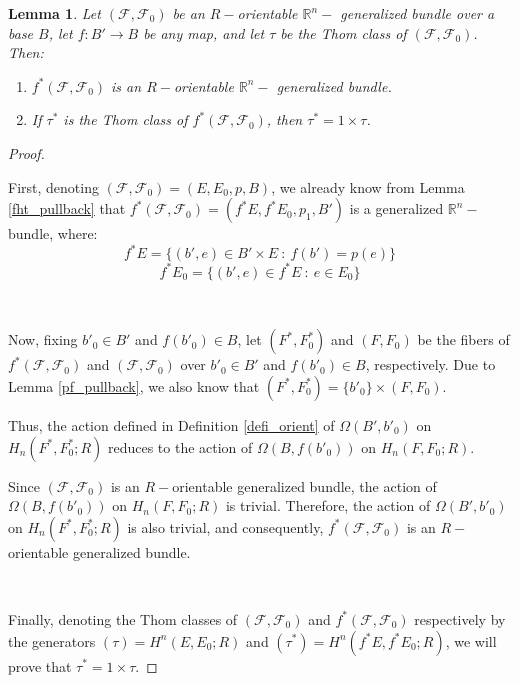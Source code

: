 \documentclass[12pt,oneside]{book}
\newtheorem{lem}    {Lemma}[chapter]
\newcommand{\R}{\mathbb{R}}
\begin{document}
    \begin{lem}\label{lema_thom_2}
    	Let $(\mathcal{F},\mathcal{F}_{0})$ be an $R-$orientable $\R^{n}-$ generalized bundle over a 
        base $B$, let $f:B'\to B$ be any map, and let $\tau$ be the Thom class of $(\mathcal{F},\mathcal{F}_{0})$. Then:
    	\begin{enumerate}
    		\item $f^{*}(\mathcal{F},\mathcal{F}_{0})$ is an $R-$orientable $\R^{n}-$ generalized bundle.
    		\item If $\tau^{*}$ is the Thom class of $f^{*}(\mathcal{F},\mathcal{F}_{0})$, then $\tau^{*}=1\times \tau$.
    	\end{enumerate}
    \end{lem}
    \begin{proof}

        \

        First, denoting $(\mathcal{F},\mathcal{F}_{0})=(E,E_{0},p,B)$, we already know from Lemma \ref{fht_pullback} that 
        $f^{*}(\mathcal{F},\mathcal{F}_{0})=(f^{*}E,f^{*}E_{0},p_{1},B')$ is a generalized $\R^{n}-$bundle, where:
        $$f^{*}E=\{ (b',e)\in B'\times E \ : \ f(b')=p(e) \}$$
        $$f^{*}E_{0}=\{ (b',e)\in f^{*}E \ : \ e\in E_{0} \}$$

        \

        Now, fixing $b'_{0}\in B'$ and $f(b'_{0})\in B$, let $(F^{*},F^{*}_{0})$ and $(F,F_{0})$ be the fibers of 
        $f^{*}(\mathcal{F},\mathcal{F}_{0})$ and $(\mathcal{F},\mathcal{F}_{0})$ over $b'_{0}\in B'$ and $f(b'_{0})\in B$, respectively. 
        Due to Lemma \ref{pf_pullback}, we also know that $(F^{*},F^{*}_{0})=\{ b'_{0} \}\times (F,F_{0})$.

        Thus, the action defined in Definition \ref{defi_orient} of $\Omega(B',b'_{0})$ on $H_{n}(F^{*},F^{*}_{0};R)$ reduces to the 
        action of $\Omega(B,f(b'_{0}))$ on $H_{n}(F,F_{0};R)$.

        Since $(\mathcal{F},\mathcal{F}_{0})$ is an $R-$orientable generalized bundle, the action of $\Omega(B,f(b'_{0}))$ on 
        $H_{n}(F,F_{0};R)$ is trivial. Therefore, the action of $\Omega(B',b'_{0})$ on $H_{n}(F^{*},F^{*}_{0};R)$ is also trivial, and 
        consequently, $f^{*}(\mathcal{F},\mathcal{F}_{0})$ is an $R-$orientable generalized bundle.

        \

        Finally, denoting the Thom classes of $(\mathcal{F},\mathcal{F}_{0})$ and $f^{*}(\mathcal{F},\mathcal{F}_{0})$ 
        respectively by the generators $(\tau)=H^{n}(E,E_{0};R)$ and $(\tau^{*})=H^{n}(f^{*}E,f^{*}E_{0};R)$, we will prove that 
        $\tau^{*}=1\times\tau$.


\end{proof}
\end{document}
